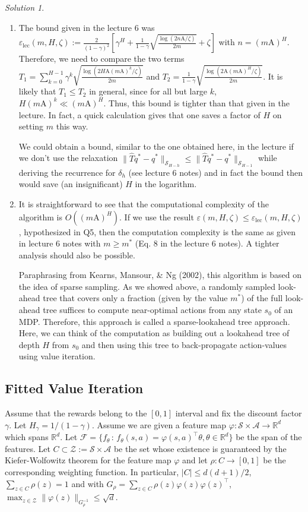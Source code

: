 \documentclass{article}
\newcommand{\norm}[1]{\| #1 \|}
\renewcommand{\epsilon}{\varepsilon}
\renewcommand{\phi}{\varphi}
\newcommand{\R}{\mathbb{R}}
\newcommand{\cZ}{\mathcal{Z}}
\DeclareMathOperator*{\1}{\mathbbm{1}}
\newcommand{\cF}{\mathcal{F}}
\newcommand{\0}{\mathbf{0}}
\theoremstyle{definition}
\theoremstyle{remark}
\newtheorem*{solution*}{Solution}
\newcommand{\cS}{\mathcal{S}}
\newcommand{\cA}{\mathcal{A}}
\begin{document}
\begin{solution*}
\begin{enumerate}
\item The bound given in the lecture 6 was $\epsilon_\text{lec}(m,H,\zeta):=\frac{2}{(1-\gamma)^2} \left[\gamma^H + \frac{1}{1-\gamma} \sqrt{ \frac{\log\left(2n\mathrm{A}/\zeta\right)}{2m} } + \zeta \right]$ with $n = (m\mathrm{A})^H$. Therefore, we need to compare the two terms $T_1 = \sum_{k=0}^{H-1} \gamma^k \sqrt{\frac{\log(2 H \mathrm{A} (m\mathrm{A})^{k} / \zeta)}{2m}}$ and $T_2 = \frac{1}{1-\gamma} \sqrt{ \frac{\log(2\mathrm{A} (m\mathrm{A})^H /\zeta)}{2m} }$. It is likely that $T_1 \leq T_2$ in general, since for all but large $k$, $H (m\mathrm{A})^k \ll (m\mathrm{A})^H$. Thus, this bound is tighter than that given in the lecture. In fact, a quick calculation gives that one saves a factor of $H$ on setting $m$ this way.

  We could obtain a bound, similar to the one obtained here, in the lecture if we don't use the relaxation $\| \hat T q^* - q^* \|_{\mathcal{S}_{H-h}} \leq \| \hat T q^* - q^* \|_{\mathcal{S}_{H-1}}$ while deriving the recurrence for $\delta_h$  (see lecture 6 notes) and in fact the bound then would save (an insignificant) $H$ in the logarithm.

\item It is straightforward to see that the computational complexity of the algorithm is $O((m\mathrm{A})^H)$. If we use the result $\varepsilon(m, H, \zeta) \leq \epsilon_\text{lec}(m, H, \zeta)$, hypothesized in Q5, then the computation complexity is the same as given in lecture 6 notes with $m \geq m^*$ (Eq. 8 in the lecture 6 notes). A tighter analysis should also be possible.

Paraphrasing from Kearns, Mansour, \& Ng (2002), this algorithm is based on the idea of sparse sampling. As we showed above, a randomly sampled look-ahead tree that covers only a fraction (given by the value $m^*$) of the full look-ahead tree suffices to compute near-optimal actions from any state $s_0$ of an MDP. Therefore, this approach is called a sparse-lookahead tree approach. Here, we can think of the computation as building out a lookahead tree of depth $H$ from $s_0$ and then using this tree to back-propagate action-values using value iteration.
\end{enumerate}
\end{solution*}

\subsection*{Fitted Value Iteration}
Assume that the rewards belong to the $[0,1]$ interval and fix the discount factor $\gamma$. Let $H_\gamma = 1/(1-\gamma)$.
Assume we are given a feature map $\phi: \cS \times \cA \to \R^d$ which spans $\R^d$.
Let $\cF = \{ f_\theta \,:\, 
f_\theta(s,a) = \phi(s,a)^\top \theta, \theta \in \R^d \}$ be the span of the features.
Let $C \subset \cZ:=\cS \times \cA$ be the set whose existence is guaranteed by the Kiefer-Wolfowitz theorem for the feature map $\phi$ and let $\rho: C \to [0,1]$ be the corresponding weighting function. In particular, $|C|\le d(d+1)/2$, $\sum_{z\in C} \rho(z)=1$ and with $G_\rho = \sum_{z\in C} \rho(z) \phi(z)\phi(z)^\top$, $\max_{z\in \cZ} \norm{\phi(z)}_{G_\rho^{-1}}\le \sqrt{d}$.
\end{document}
